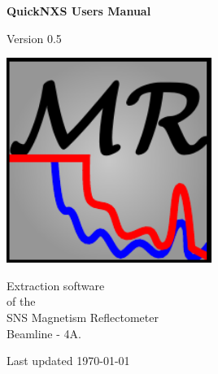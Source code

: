 \begin{titlepage}

\vspace*{0.2in}

\begin{center}
  \begin{Huge}
    \textbf{QuickNXS Users Manual}
  \end{Huge}

  \vspace*{0.3in}

  \begin{LARGE}  
    Version 0.5
  \end{LARGE}

  \vspace*{0.5in}

  \includegraphics[width=0.5\textwidth]{../../icons/logo.pdf}

  \vspace*{0.5in}
  \begin{LARGE}    
    Extraction software\\
    of the \\
    SNS Magnetism Reflectometer\\
    Beamline - 4A.
  \end{LARGE}    
    \vspace*{0.2in}
    
  \begin{large}
    Last updated \today
  \end{large}
\end{center}


 
\end{titlepage}
